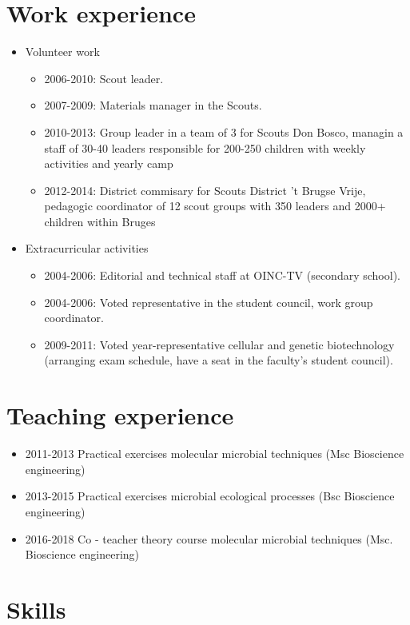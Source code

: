 \documentclass[a4paper,11pt,oneside]{article}
\begin{document}
\section*{Work experience}
\begin{itemize}
\item Volunteer work
	\begin{itemize}
	\item 2006-2010: Scout leader.
	\item 2007-2009: Materials manager in the Scouts.
  \item 2010-2013: Group leader in a team of 3 for Scouts Don Bosco, managin a staff of 30-40 leaders responsible for 200-250 children with weekly activities and yearly camp
  \item 2012-2014: District commisary for Scouts District 't Brugse Vrije, pedagogic coordinator of 12 scout groups with 350 leaders and 2000+ children within Bruges
	\end{itemize}
\item Extracurricular activities
	\begin{itemize}
	\item 2004-2006: Editorial and technical staff at OINC-TV (secondary school). 
	\item 2004-2006: Voted representative in the student council, work group coordinator.
	\item 2009-2011: Voted year-representative cellular and genetic biotechnology (arranging exam schedule, have a seat in the faculty's student council).
	\end{itemize}
\end{itemize}

\section*{Teaching experience}
\begin{itemize}
  \item 2011-2013 Practical exercises molecular microbial techniques (Msc Bioscience engineering)
  \item 2013-2015 Practical exercises microbial ecological processes (Bsc Bioscience engineering)
  \item 2016-2018 Co - teacher theory course molecular microbial techniques (Msc. Bioscience engineering)
\end{itemize}

\section*{Skills}
\end{document}
